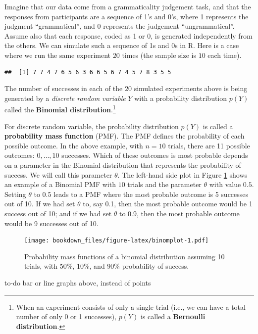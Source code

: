 \documentclass[12pt,]{krantz}
\makeatletter
\newenvironment{kframe}{%
\medskip{}
\setlength{\fboxsep}{.8em}
 \def\at@end@of@kframe{}%
 \ifinner\ifhmode%
  \def\at@end@of@kframe{\end{minipage}}%
  \begin{minipage}{\columnwidth}%
 \fi\fi%
 \def\FrameCommand##1{\hskip\@totalleftmargin \hskip-\fboxsep
 \colorbox{shadecolor}{##1}\hskip-\fboxsep
     \hskip-\linewidth \hskip-\@totalleftmargin \hskip\columnwidth}%
 \MakeFramed {\advance\hsize-\width
   \@totalleftmargin\z@ \linewidth\hsize
   \@setminipage}}%
 {\par\unskip\endMakeFramed%
 \at@end@of@kframe}
\newenvironment{rmdblock}[1]
  {
  \begin{itemize}
  \renewcommand{\labelitemi}{
    \raisebox{-.7\height}[0pt][0pt]{
      {\setkeys{Gin}{width=3em,keepaspectratio}\texttt{[image: images/\#1]}}
    }
  }
  \setlength{\fboxsep}{1em}
  \begin{kframe}
  \item
  }
  {
  \end{kframe}
  \end{itemize}
  }
\newenvironment{rmdnote}
  {\begin{rmdblock}{note}}
  {\end{rmdblock}}
\makeatother
\begin{document}
Imagine that our data come from a grammaticality judgement task, and that the responses from participants are a sequence of 1's and 0's, where 1 represents the judgment ``grammatical'', and 0 represents the judgement ``ungrammatical''. Assume also that each response, coded as 1 or 0, is generated independently from the others. We can simulate such a sequence of 1s and 0s in R. Here is a case where we run the same experiment \(20\) times (the sample size is \(10\) each time).

\begin{verbatim}
##  [1] 7 7 4 7 6 5 6 3 6 6 5 6 7 4 5 7 8 3 5 5
\end{verbatim}

The number of successes in each of the \(20\) simulated experiments above is being generated by a \emph{discrete random variable} \(Y\) with a probability distribution \(p(Y)\) called the \textbf{Binomial distribution}.\footnote{When an experiment consists of only a single trial (i.e., we can have a total number of only 0 or 1 successes), \(p(Y)\) is called a \textbf{Bernoulli distribution}.}

For discrete random variable, the probability distribution \(p(Y)\) is called a \textbf{probability mass function} (PMF). The PMF defines the probability of each possible outcome. In the above example, with \(n=10\) trials, there are 11 possible outcomes: \(0,\dots,10\) successes. Which of these outcomes is most probable depends on a parameter in the Binomial distribution that represents the probability of success. We will call this parameter \(\theta\). The left-hand side plot in Figure \ref{fig:binomplot} shows an example of a Binomial PMF with \(10\) trials and the parameter \(\theta\) with value \(0.5\). Setting \(\theta\) to 0.5 leads to a PMF where the most probable outcome is 5 successes out of 10. If we had set \(\theta\) to, say 0.1, then the most probable outcome would be 1 success out of 10; and if we had set \(\theta\) to 0.9, then the most probable outcome would be 9 successes out of 10.

\begin{figure}
\centering
\texttt{[image: bookdown\_files/figure-latex/binomplot-1.pdf]}
\caption{\label{fig:binomplot}Probability mass functions of a binomial distribution assuming 10 trials, with 50\%, 10\%, and 90\% probability of success.}
\end{figure}

\begin{rmdnote}
to-do bar or line graphs above, instead of points
\end{rmdnote}
\end{document}
